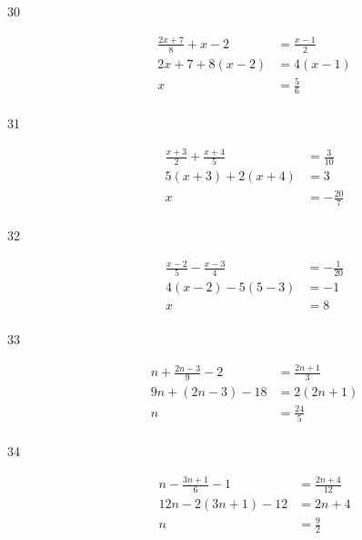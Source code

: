 \documentclass[letterpaper]{exam}
\begin{document}
\begin{description}
      \item[30]
        \begin{align*}
          \frac{2x + 7}{8} + x - 2 & = \frac{x-1}{2} \\
          2x + 7 + 8(x - 2)        & = 4(x - 1) \\
          x                        & = \boxed{ \frac{5}{6} } \\
        \end{align*}

      \item[31]
        \begin{align*}
          \frac{x + 3}{2} + \frac{x + 4}{5} & = \frac{3}{10} \\
          5(x + 3) + 2(x + 4)               & = 3 \\
          x                                 & = \boxed{ -\frac{20}{7} } \\
        \end{align*}


      \item[32]
        \begin{align*}
          \frac{x - 2}{5} - \frac{x - 3}{4} & = -\frac{1}{20} \\
          4(x - 2) - 5(5 - 3)               & = -1 \\
          x                                 & = \boxed{ 8 } \\
        \end{align*}

      \item[33]
        \begin{align*}
          n + \frac{2n - 3}{9} - 2 & = \frac{2n + 1}{3} \\
          9n + (2n - 3) - 18       & = 2 (2n + 1) \\
          n                        & = \boxed{ \frac{24}{5} } \\
        \end{align*}

      \item[34]
        \begin{align*}
          n - \frac{3n + 1}{6} - 1 & = \frac{2n + 4}{12} \\
          12n - 2(3n + 1) - 12     & = 2n + 4 \\
          n                        & = \boxed{ \frac{9}{2} } \\
        \end{align*}


\end{description}
\end{document}
